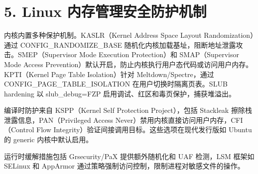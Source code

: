 \chapter{5. Linux 内存管理安全防护机制}
内核内置多种保护机制。KASLR（Kernel Address Space Layout Randomization）通过 CONFIG\_{}RANDOMIZE\_{}BASE 随机化内核加载基址，阻断地址泄露攻击。SMEP（Supervisor Mode Execution Protection）和 SMAP（Supervisor Mode Access Prevention）默认开启，防止内核执行用户态代码或访问用户内存。KPTI（Kernel Page Table Isolation）针对 Meltdown/Spectre，通过 CONFIG\_{}PAGE\_{}TABLE\_{}ISOLATION 在用户切换时隔离页表。SLUB hardening 以 slub\_{}debug=FZP 启用调试、红区和毒页保护，捕获堆溢出。\par
编译时防护来自 KSPP（Kernel Self Protection Project），包括 Stackleak 擦除栈泄露信息，PAN（Privileged Access Never）禁用内核直接访问用户内存，CFI（Control Flow Integrity）验证间接调用目标。这些选项在现代发行版如 Ubuntu 的 generic 内核中默认启用。\par
运行时缓解措施包括 Grsecurity/PaX 提供额外随机化和 UAF 检测，LSM 框架如 SELinux 和 AppArmor 通过策略强制访问控制，限制进程对敏感文件的操作。\par
